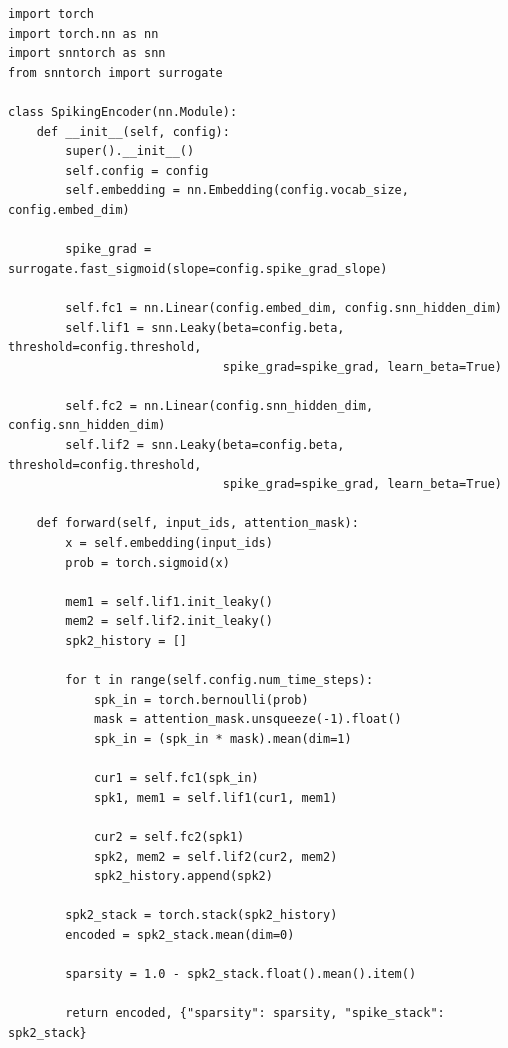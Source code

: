 \documentclass[11pt,a4paper]{article}
\begin{document}
\begin{lstlisting}[caption={Spiking Encoder Implementation}]
import torch
import torch.nn as nn
import snntorch as snn
from snntorch import surrogate

class SpikingEncoder(nn.Module):
    def __init__(self, config):
        super().__init__()
        self.config = config
        self.embedding = nn.Embedding(config.vocab_size, config.embed_dim)
        
        spike_grad = surrogate.fast_sigmoid(slope=config.spike_grad_slope)
        
        self.fc1 = nn.Linear(config.embed_dim, config.snn_hidden_dim)
        self.lif1 = snn.Leaky(beta=config.beta, threshold=config.threshold,
                              spike_grad=spike_grad, learn_beta=True)
        
        self.fc2 = nn.Linear(config.snn_hidden_dim, config.snn_hidden_dim)
        self.lif2 = snn.Leaky(beta=config.beta, threshold=config.threshold,
                              spike_grad=spike_grad, learn_beta=True)
    
    def forward(self, input_ids, attention_mask):
        x = self.embedding(input_ids)
        prob = torch.sigmoid(x)
        
        mem1 = self.lif1.init_leaky()
        mem2 = self.lif2.init_leaky()
        spk2_history = []
        
        for t in range(self.config.num_time_steps):
            spk_in = torch.bernoulli(prob)
            mask = attention_mask.unsqueeze(-1).float()
            spk_in = (spk_in * mask).mean(dim=1)
            
            cur1 = self.fc1(spk_in)
            spk1, mem1 = self.lif1(cur1, mem1)
            
            cur2 = self.fc2(spk1)
            spk2, mem2 = self.lif2(cur2, mem2)
            spk2_history.append(spk2)
        
        spk2_stack = torch.stack(spk2_history)
        encoded = spk2_stack.mean(dim=0)
        
        sparsity = 1.0 - spk2_stack.float().mean().item()
        
        return encoded, {"sparsity": sparsity, "spike_stack": spk2_stack}
\end{lstlisting}
\end{document}

